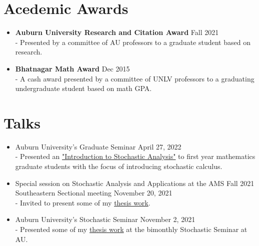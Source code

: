 \documentclass[letterpaper,12pt]{article}
\begin{document}
\section{Acedemic Awards}
\begin{itemize}[itemsep = -0pt, topsep=0pt]
	    \item \noindent \textbf{Auburn University Research and Citation Award} \hfill Fall 2021 \\
	    \vspace{.05in} 
	- Presented by a committee of AU professors to a graduate student based on research.
	
    \item \noindent \textbf{Bhatnagar Math Award} \hfill Dec 2015 \\
    \vspace{.05in} 
     - A cash award presented by a committee of UNLV professors to a graduating undergraduate student based on math GPA. 
\end{itemize}



 
 \section{Talks}
 
\begin{itemize}[itemsep = -0pt, topsep=0pt]
\item  \noindent Auburn University's Graduate Seminar \hfill April 27, 2022 \\
\vspace{.05in} 
- Presented an \href{https://github.com/nickeisenberg/School/blob/master/Presentations/GradSeminar(4-27-22)\%20/GdSemTalk.pdf}{"Introduction to Stochastic Analysis"} to first year mathematics \\ graduate students with the focus of introducing stochastic calculus.

\item \noindent Special session on Stochastic Analysis and Applications at the AMS Fall 2021 \\ Southeastern Sectional meeting \hfill November 20, 2021 \\
\vspace{.05in} 
- Invited to present some of my \href{https://github.com/nickeisenberg/School/blob/master/Presentations/AMSmeeting/ams.pdf}{thesis work}.
\vspace{.05in} 

\item \noindent Auburn University's Stochastic Seminar \hfill November 2, 2021 \\
\vspace{.05in} 
- Presented some of my \href{https://github.com/nickeisenberg/School/blob/master/Presentations/AUStochSeminar(11-20-21)/presentation.pdf}{thesis work} at the bimonthly Stochastic Seminar at AU. 
\end{itemize}
\end{document}
